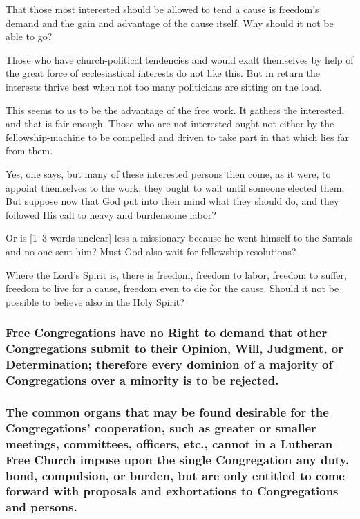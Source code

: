 That those most interested should be allowed to tend a cause is freedom’s demand and the gain and advantage of the cause itself. Why should it not be able to go?

Those who have church-political tendencies and would exalt themselves by help of the great force of ecclesiastical interests do not like this. But in return the interests thrive best when not too many politicians are sitting on the load.

This seems to us to be the advantage of the free work. It gathers the interested, and that is fair enough. Those who are not interested ought not either by the fellowship-machine to be compelled and driven to take part in that which lies far from them.

Yes, one says, but many of these interested persons then come, as it were, to appoint themselves to the work; they ought to wait until someone elected them. But suppose now that God put into their mind what they should do, and they followed His call to heavy and burdensome labor?

Or is [1–3 words unclear] less a missionary because he went himself to the Santals and no one sent him? Must God also wait for fellowship resolutions?

Where the Lord’s Spirit is, there is freedom, freedom to labor, freedom to suffer, freedom to live for a cause, freedom even to die for the cause. Should it not be possible to believe also in the Holy Spirit?






\subsubsection{Free Congregations have no Right to demand that other Congregations submit to their Opinion, Will, Judgment, or Determination; therefore every dominion of a majority of Congregations over a minority is to be rejected.}

\subsubsection{The common organs that may be found desirable for the Congregations’ cooperation, such as greater or smaller meetings, committees, officers, etc., cannot in a Lutheran Free Church impose upon the single Congregation any duty, bond, compulsion, or burden, but are only entitled to come forward with proposals and exhortations to Congregations and persons.}

